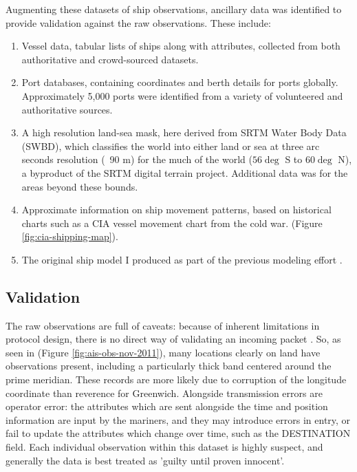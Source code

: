 Augmenting these datasets of ship observations, ancillary data was identified to provide validation against the raw observations. These include: 

\begin{enumerate}
  \item Vessel data, tabular lists of ships along with attributes, collected from both authoritative and crowd-sourced datasets.
  \item Port databases, containing coordinates and berth details for ports globally. Approximately 5,000 ports were identified from a variety of volunteered and authoritative sources.
  \item A high resolution land-sea mask, here derived from SRTM Water Body Data (SWBD), which classifies the world into either land or sea at three arc seconds resolution (~90 m) for the much of the world ($56\deg$ S to $60\deg$ N), a byproduct of the SRTM digital terrain project\cite{rabus2003shuttle}. Additional data was for the areas beyond these bounds.
  \item Approximate information on ship movement patterns, based on historical charts such as a CIA vessel movement chart from the cold war. (Figure \ref{fig:cia-shipping-map}).
  \item The original ship model I produced as part of the previous modeling effort \citep{Halpern2008}.
\end{enumerate}

\subsection{Validation}

The raw observations are full of caveats: because of inherent limitations in protocol design, there is no direct way of validating an incoming packet \cite{RaymondInPress}. So, as seen in (Figure \ref{fig:ais-obs-nov-2011}), many locations clearly on land have observations present, including a particularly thick band centered around the prime meridian. These records are more likely due to corruption of the longitude coordinate than reverence for Greenwich. Alongside transmission errors are operator error: the attributes which are sent alongside the time and position information are input by the mariners, and they may introduce errors in entry, or fail to update the attributes which change over time, such as the DESTINATION field. Each individual observation within this dataset is highly suspect, and generally the data is best treated as 'guilty until proven innocent'.

